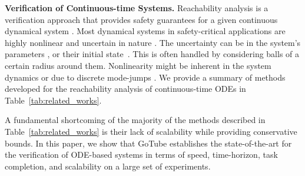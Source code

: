 \documentclass[letterpaper]{article} %
\begin{document}
\noindent\textbf{Verification of Continuous-time Systems.} Reachability analysis is a verification approach that provides safety guarantees for a given continuous dynamical system \cite{gurung2019parallel,vinod2021stochastic}. Most dynamical systems in safety-critical applications are highly nonlinear and uncertain in nature \cite{lechner2020neural}. The uncertainty can be in the system's parameters \cite{sreach,probreach,reliablecomput}, or their initial state~\cite{reliablecomput,10.1145/3126508}. This is often handled by considering balls of a certain radius around them. Nonlinearity might be inherent in the system dynamics or due to 
discrete mode-jumps \cite{e71eb65e23844408b72fe95a84f88cb6}.
We provide a summary of methods developed for the reachability analysis of continuous-time ODEs in Table~\ref{tab:related_works}. 

A fundamental shortcoming of the majority of the methods described in Table~\ref{tab:related_works} is their lack of scalability while providing conservative bounds.
In this paper, we show that GoTube establishes the state-of-the-art for the verification of ODE-based systems in terms of speed, time-horizon, task completion, and scalability on a large set of experiments.


\end{document}
